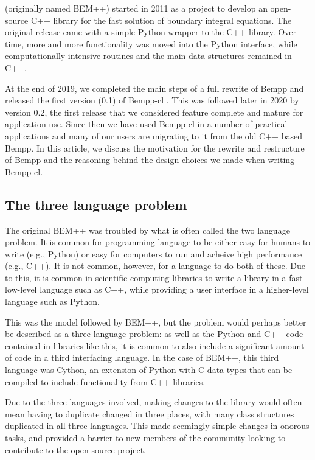  (originally named BEM++) started in 2011 as a project to develop an open-source C++ library for the fast solution of boundary integral equations. The original release came with a simple Python wrapper to the C++ library. Over time, more and more functionality was moved into the Python interface, while computationally intensive routines and the main data structures remained in C++.

At the end of 2019, we completed the main steps of a full rewrite of Bempp and released the first version (0.1) of Bempp-cl \cite{Bempp-cl}. This was followed later in 2020 by version 0.2, the first release that we considered feature complete and mature for application use. Since then we have used Bempp-cl in a number of practical applications and many of our users are migrating to it from the old C++ based Bempp. In this article, we discuss the motivation for the rewrite and restructure of Bempp and the reasoning behind the design choices we made when writing Bempp-cl.

\subsection{The three language problem}
The original BEM++ was troubled by what is often called the two language problem. It is common for programming language to be either easy for humans to write (e.g., Python) or easy for computers to run and acheive high performance (e.g., C++). It is not common, however, for a language to do both of these. Due to this, it is common in scientific computing libraries to write a library in a fast low-level language such as C++, while providing a user interface in a higher-level language such as Python.

This was the model followed by BEM++, but the problem would perhaps better be described as a three language problem: as well as the Python and C++ code contained in libraries like this, it is common to also include a significant amount of code in a third interfacing language. In the case of BEM++, this third language was Cython, an extension of Python with C data types that can be compiled to include functionality from C++ libraries.

Due to the three languages involved, making changes to the library would often mean having to duplicate changed in three places, with many class structures duplicated in all three languages. This made seemingly simple changes in onorous tasks, and provided a barrier to new members of the community looking to contribute to the open-source project.

